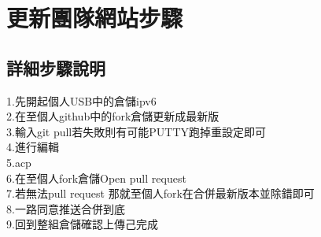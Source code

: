\chapter{更新團隊網站步驟}
\section{詳細步驟說明}


 1.先開起個人USB中的倉儲ipv6\\

2.在至個人github中的fork倉儲更新成最新版\\

3.輸入git pull若失敗則有可能PUTTY跑掉重設定即可\\

4.進行編輯\\

5.acp\\

6.在至個人fork倉儲Open pull request\\

7.若無法pull request 那就至個人fork在合併最新版本並除錯即可\\

8.一路同意推送合併到底\\

9.回到整組倉儲確認上傳己完成\\



